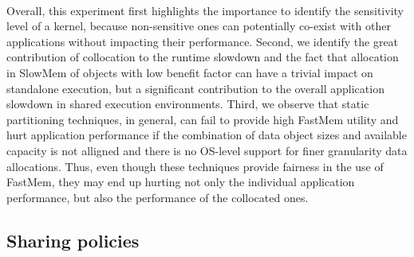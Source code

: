 \\
\vspace{0.3ex}
\noindent Overall, this experiment first highlights the importance to identify the sensitivity level of a kernel, 
because non-sensitive ones can potentially co-exist with other applications without impacting their performance.  
Second, we identify the great contribution of collocation to the runtime slowdown and the fact that allocation in SlowMem of objects with low benefit factor can have a trivial impact on standalone execution, but a significant contribution to the overall application slowdown in shared execution environments. 
Third, we observe that static partitioning techniques, in general, can fail to provide high FastMem utility and hurt 
application performance if the combination of data object sizes and available capacity is not 
alligned and there is no OS-level support for finer granularity data allocations. Thus, even though these techniques provide fairness in the use of FastMem, they may end up hurting not only the individual application performance, but also the performance of the collocated ones. 
 
 
\subsection{Sharing policies}
\label{subsec:merge}

